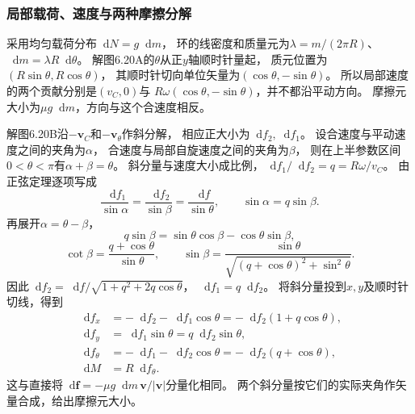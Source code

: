 \documentclass[UTF8,fontset=fandol,a4paper,11pt]{ctexart}
\newcommand{\dd}{\mathop{}\!\mathrm{d}}
\begin{document}
\subsubsection*{局部载荷、速度与两种摩擦分解}
采用均匀载荷分布$\dd N=g\dd m$，
环的线密度和质量元为$\lambda=m/(2\pi R)$、$\dd m=\lambda R\dd\theta$。
解图6.20A的$\theta$从正$y$轴顺时针量起，
质元位置为$(R\sin\theta,R\cos\theta)$，
其顺时针切向单位矢量为$(\cos\theta,-\sin\theta)$。
所以局部速度的两个贡献分别是$(v_C,0)$与
$R\omega(\cos\theta,-\sin\theta)$，并不都沿平动方向。
摩擦元大小为$\mu g\dd m$，方向与这个合速度相反。

解图6.20B沿$-\boldsymbol v_C$和$-\boldsymbol v_\theta$作斜分解，
相应正大小为$\dd f_2,\dd f_1$。
设合速度与平动速度之间的夹角为$\alpha$，
合速度与局部自旋速度之间的夹角为$\beta$，
则在上半参数区间$0<\theta<\pi$有$\alpha+\beta=\theta$。
斜分量与速度大小成比例，$\dd f_1/\dd f_2=q=R\omega/v_C$。
由正弦定理逐项写成
\[
\frac{\dd f_1}{\sin\alpha}
=\frac{\dd f_2}{\sin\beta}
=\frac{\dd f}{\sin\theta},
\qquad \sin\alpha=q\sin\beta.
\]
再展开$\alpha=\theta-\beta$，
\[
q\sin\beta=\sin\theta\cos\beta-\cos\theta\sin\beta,
\]
\[
\cot\beta=\frac{q+\cos\theta}{\sin\theta},
\qquad
\sin\beta=\frac{\sin\theta}{\sqrt{(q+\cos\theta)^2+\sin^2\theta}}.
\]
因此$\dd f_2=\dd f/\sqrt{1+q^2+2q\cos\theta}$，
$\dd f_1=q\dd f_2$。
将斜分量投到$x,y$及顺时针切线，得到
\[
\begin{aligned}
\dd f_x&=-\dd f_2-\dd f_1\cos\theta
=-\dd f_2(1+q\cos\theta),\\
\dd f_y&=\dd f_1\sin\theta=q\dd f_2\sin\theta,\\
\dd f_\theta&=-\dd f_1-\dd f_2\cos\theta
=-\dd f_2(q+\cos\theta),\\
\dd M&=R\dd f_\theta.
\end{aligned}
\]
这与直接将$\dd\boldsymbol f=-\mu g\dd m\,\boldsymbol v/|\boldsymbol v|$分量化相同。
两个斜分量按它们的实际夹角作矢量合成，给出摩擦元大小。
\end{document}
